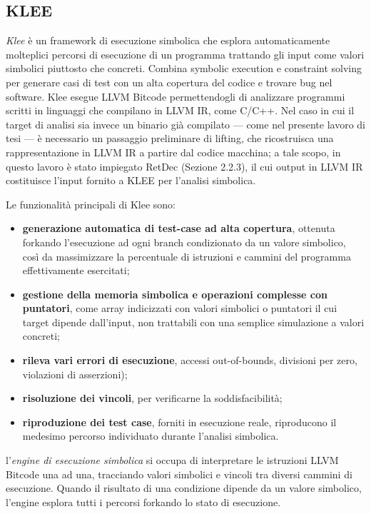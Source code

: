 \subsection{KLEE}
\label{subsec:klee}
    \textit{Klee} è un framework di esecuzione simbolica che esplora automaticamente molteplici percorsi di esecuzione di un programma trattando gli input come valori simbolici piuttosto che concreti. Combina symbolic execution e constraint solving per generare casi di test con un alta copertura del codice e trovare bug nel software. Klee esegue LLVM Bitcode permettendogli di analizzare programmi scritti in linguaggi che compilano in LLVM IR, come C/C++. Nel caso in cui il target di analisi sia invece un binario già compilato — come nel presente lavoro di tesi — è necessario un passaggio preliminare di lifting, che ricostruisca una rappresentazione in LLVM IR a partire dal codice macchina; a tale scopo, in questo lavoro è stato impiegato RetDec (Sezione 2.2.3), il cui output in LLVM IR costituisce l'input fornito a KLEE per l'analisi simbolica.
    
    Le funzionalità principali di Klee sono:
    \begin{itemize}[noitemsep]
        \item \textbf{generazione automatica di test-case ad alta copertura}, ottenuta forkando l'esecuzione ad ogni branch condizionato da un valore simbolico, così da massimizzare la percentuale di istruzioni e cammini del programma effettivamente esercitati;
        \item \textbf{gestione della memoria simbolica e operazioni complesse con puntatori}, come array indicizzati con valori simbolici o puntatori il cui target dipende dall'input, non trattabili con una semplice simulazione a valori concreti;
        \item \textbf{rileva vari errori di esecuzione}, accessi out-of-bounds, divisioni per zero, violazioni di asserzioni);
        \item \textbf{risoluzione dei vincoli}, per verificarne la soddisfacibilità;
        \item \textbf{riproduzione dei test case}, forniti in esecuzione reale, riproducono il medesimo percorso individuato durante l'analisi simbolica.
    \end{itemize}

    l'\textit{engine di esecuzione simbolica} si occupa di interpretare le istruzioni LLVM Bitcode una ad una, tracciando valori simbolici e vincoli tra diversi cammini di esecuzione. Quando il risultato di una condizione dipende da un valore simbolico, l'engine esplora tutti i percorsi forkando lo stato di esecuzione.

